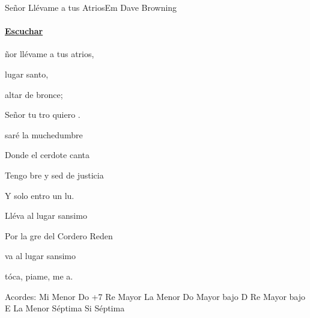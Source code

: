 \documentclass[12pt, spanish]{book}
\begin{document}
    \begin{song}{Señor Llévame a tus Atrios}{Em}
    {} %
    {Dave Browning}
    {} %
    {}
        \ifChordBk
        \paragraph{\mbox{}\hfill\protect\href{https://open.spotify.com/intl-es/track/68ejKEwjnLJrJgu2ozQdJQ}{Escuchar}\mbox{}\hfill}
        \fi

        \begin{SBOpGroup}
            ñor llévame a tus atrios,

             lugar santo,

             altar de bronce;

            Señor tu tro quiero .
        \end{SBOpGroup}

        \begin{SBOpGroup}
            saré la muchedumbre

            Donde el cerdote canta

            Tengo bre y sed de justicia

            Y solo entro un lu.
        \end{SBOpGroup}

        \begin{SBChorus}
            Lléva al lugar sansimo

            Por la gre del Cordero Reden

            va al lugar sansimo

            tóca, piame, me a.
        \end{SBChorus}

        \ifChordBk
        \begin{SBOpGroup}
            Acordes:\break
            \upchord{\Em}\qquad Mi Menor \hfill
            \upchord{\CMaj}\qquad Do +7 \hfill\null\break
            \upchord{\D}\qquad Re Mayor \hfill
            \upchord{\Am}\qquad La Menor \hfill\null\break
            \upchord{\CD}\qquad Do Mayor bajo D \hfill
            \upchord{\DE}\qquad Re Mayor bajo E \hfill\null\break
            \upchord{\Amseven}\qquad La Menor S\'eptima \hfill
            \upchord{\Bseven}\qquad Si S\'eptima \hfill\null\break
        \end{SBOpGroup}
        \fi
    \end{song}
\end{document}
